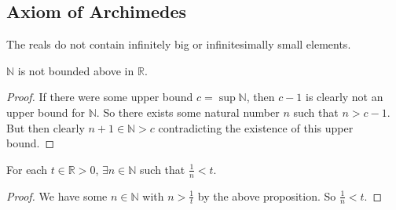 \documentclass{article}
\begin{document}
\subsection{Axiom of Archimedes}
The reals do not contain infinitely big or infinitesimally small elements.
\begin{proposition}
	$\mathbb N$ is not bounded above in $\mathbb R$.
\end{proposition}
\begin{proof}
	If there were some upper bound $c = \sup \mathbb N$, then $c-1$ is clearly not an upper bound for $\mathbb N$. So there exists some natural number $n$ such that $n > c-1$. But then clearly $n+1 \in \mathbb N > c$ contradicting the existence of this upper bound.
\end{proof}
\begin{corollary}
	For each $t \in \mathbb R > 0$, $\exists n \in \mathbb N$ such that $\frac{1}{n} < t$.
\end{corollary}
\begin{proof}
	We have some $n \in \mathbb N$ with $n > \frac{1}{t}$ by the above proposition. So $\frac{1}{n} < t$.
\end{proof}
\end{document}
